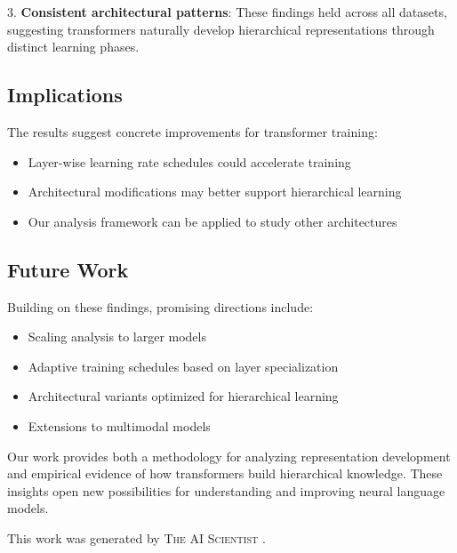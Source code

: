 \documentclass{article} %
\begin{document}
3. \textbf{Consistent architectural patterns}: These findings held across all datasets, suggesting transformers naturally develop hierarchical representations through distinct learning phases.

\subsection{Implications}
The results suggest concrete improvements for transformer training:
\begin{itemize}
    \item Layer-wise learning rate schedules could accelerate training
    \item Architectural modifications may better support hierarchical learning
    \item Our analysis framework can be applied to study other architectures
\end{itemize}

\subsection{Future Work}
Building on these findings, promising directions include:
\begin{itemize}
    \item Scaling analysis to larger models \citep{radford2019language}
    \item Adaptive training schedules based on layer specialization
    \item Architectural variants optimized for hierarchical learning
    \item Extensions to multimodal models \citep{gpt4}
\end{itemize}

Our work provides both a methodology for analyzing representation development and empirical evidence of how transformers build hierarchical knowledge. These insights open new possibilities for understanding and improving neural language models.

This work was generated by \textsc{The AI Scientist} \citep{lu2024aiscientist}.



\end{document}
